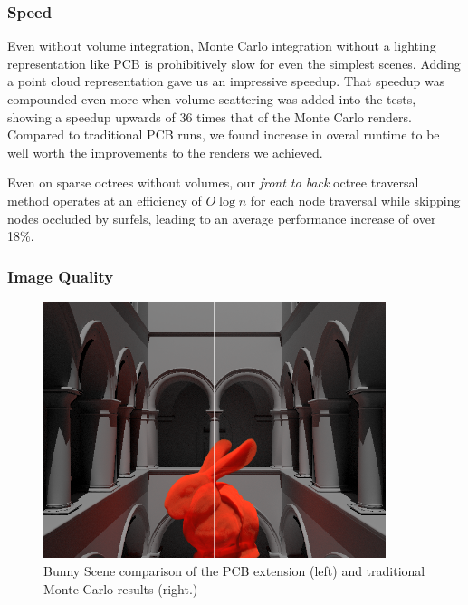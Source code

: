 \documentclass[runningheads]{llncs}
\begin{document}
\subsubsection{Speed}
Even without volume integration, Monte Carlo integration without a lighting representation like PCB is prohibitively slow for even the simplest scenes.  Adding a point cloud representation gave us an impressive speedup.  That speedup was compounded even more when volume scattering was added into the tests, showing a speedup upwards of 36 times that of the Monte Carlo renders.  Compared to traditional PCB runs, we found increase in overal runtime to be well worth the improvements to the renders we achieved.

Even on sparse octrees without volumes, our \textit{front to back} octree traversal method operates at an efficiency of $O\log{n}$ for each node traversal while skipping nodes occluded by surfels, leading to an average performance increase of over 18\%.

\subsubsection*{Image Quality}

\begin{figure}[h!]
    \centering
    \includegraphics[width=100mm]{img/compare.png}
    \caption{Bunny Scene comparison of the PCB extension (left) and traditional Monte Carlo results (right.)}
    \label{fig:compare1}
\end{figure}
\end{document}
